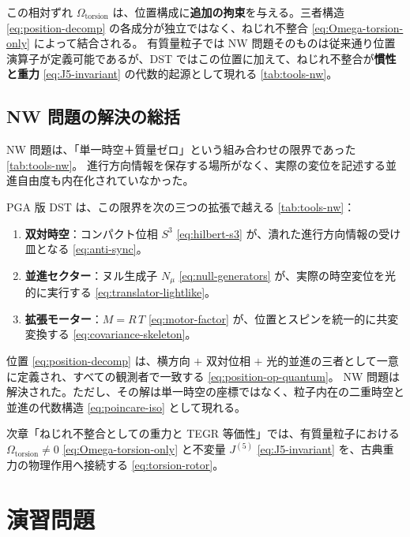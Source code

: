 \documentclass[dvipdfmx,a4paper,oneside]{jsbook}
\numberwithin{equation}{chapter}
\begin{document}
この相対ずれ \(\Omega_{\mathrm{torsion}}\) は、位置構成に\textbf{追加の拘束}を与える。三者構造 \eqref{eq:position-decomp} の各成分が独立ではなく、ねじれ不整合 \eqref{eq:Omega-torsion-only} によって結合される。
有質量粒子では NW 問題そのものは従来通り位置演算子が定義可能であるが、DST ではこの位置に加えて、ねじれ不整合が\textbf{慣性と重力} \eqref{eq:J5-invariant} の代数的起源として現れる \eqref{tab:tools-nw}。

\subsection{NW 問題の解決の総括}

NW 問題は、「単一時空＋質量ゼロ」という組み合わせの限界であった \eqref{tab:tools-nw}。
進行方向情報を保存する場所がなく、実際の変位を記述する並進自由度も内在化されていなかった。

PGA 版 DST は、この限界を次の三つの拡張で越える \eqref{tab:tools-nw}：
\begin{enumerate}[leftmargin=2em]
  \item \textbf{双対時空}：コンパクト位相 \(S^3\) \eqref{eq:hilbert-s3} が、潰れた進行方向情報の受け皿となる \eqref{eq:anti-sync}。
  \item \textbf{並進セクター}：ヌル生成子 \(N_\mu\) \eqref{eq:null-generators} が、実際の時空変位を光的に実行する \eqref{eq:translator-lightlike}。
  \item \textbf{拡張モーター}：\(M = R\,T\) \eqref{eq:motor-factor} が、位置とスピンを統一的に共変変換する \eqref{eq:covariance-skeleton}。
\end{enumerate}

位置 \eqref{eq:position-decomp} は、横方向 \(+\) 双対位相 \(+\) 光的並進の三者として一意に定義され、すべての観測者で一致する \eqref{eq:position-op-quantum}。
NW 問題は解決された。ただし、その解は単一時空の座標ではなく、粒子内在の二重時空と並進の代数構造 \eqref{eq:poincare-iso} として現れる。

次章「ねじれ不整合としての重力と TEGR 等価性」では、有質量粒子における \(\Omega_{\mathrm{torsion}} \neq 0\) \eqref{eq:Omega-torsion-only} と不変量 \(J^{(5)}\) \eqref{eq:J5-invariant} を、古典重力の物理作用へ接続する \eqref{eq:torsion-rotor}。

\section*{演習問題}
\end{document}
